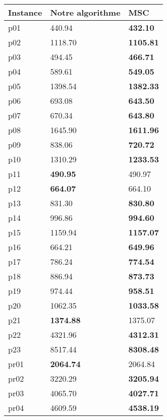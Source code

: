 \begin{xltabular}{12cm}{|X|X|X|}
    \hline
    Instance & Notre algorithme     & MSC      \\\hline
    p01      &  440.94  & \textbf{432.10}   \\\hline
    p02      & 1118.70 & \textbf{1105.81}  \\\hline
    p03      & 494.45  & \textbf{466.71}   \\\hline
    p04      & 589.61  & \textbf{549.05}   \\\hline
    p05      & 1398.54 & \textbf{1382.33}  \\\hline
    p06      & 693.08  & \textbf{643.50}   \\\hline
    p07      & 670.34  & \textbf{643.80}   \\\hline
    p08      & 1645.90 & \textbf{1611.96}  \\\hline
    p09      & 838.06  & \textbf{720.72}   \\\hline
    p10      & 1310.29 & \textbf{1233.53}  \\\hline
    p11      & \textbf{490.95}& 490.97   \\\hline
    p12      & \textbf{664.07}  & 664.10   \\\hline
    p13      & 831.30  & \textbf{830.80}   \\\hline
    p14      & 996.86  & \textbf{994.60}   \\\hline
    p15      & 1159.94 & \textbf{1157.07}  \\\hline
    p16      & 664.21  & \textbf{649.96}   \\\hline
    p17      & 786.24  & \textbf{774.54}   \\\hline
    p18      & 886.94  & \textbf{873.73}   \\\hline
    p19      & 974.44  & \textbf{958.51}   \\\hline
    p20      & 1062.35 & \textbf{1033.58}  \\\hline
    p21      & \textbf{1374.88} & 1375.07 \\\hline
    p22      & 4321.96 & \textbf{4312.31}  \\\hline
    p23      & 8517.44 & \textbf{8308.48}  \\\hline
    pr01     & \textbf{2064.74} & 2064.84  \\\hline
    pr02     & 3220.29 & \textbf{3205.94}  \\\hline
    pr03     & 4065.70 & \textbf{4027.71}  \\\hline
    pr04     & 4609.59 & \textbf{4538.19}  \\\hline

\end{xltabular}
